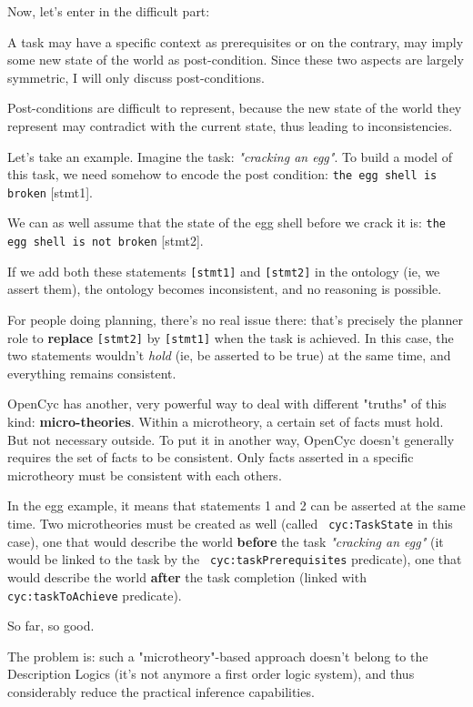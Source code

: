 Now, let's enter in the difficult part:

A task may have a specific context as prerequisites or on the contrary, may
imply some new state of the world as post-condition.  Since these two aspects
are largely symmetric, I will only discuss post-conditions.

Post-conditions are difficult to represent, because the new state of the world
they represent may contradict with the current state, thus leading to
inconsistencies.

Let's take an example. Imagine the task: \emph{"cracking an egg"}. To build a
model of this task, we need somehow to encode the post condition: {\tt the egg
shell is broken} [stmt1].

We can as well assume that the state of the egg shell before we crack it is:
{\tt the egg shell is not broken} [stmt2].

If we add both these statements {\tt [stmt1]} and {\tt [stmt2]} in the ontology
(ie, we assert them), the ontology becomes inconsistent, and no reasoning is
possible.

For people doing planning, there's no real issue there: that's precisely the
planner role to {\bf replace} {\tt [stmt2]} by {\tt [stmt1]} when the task is
achieved. In this case, the two statements wouldn't \emph{hold} (ie, be
asserted to be true) at the same time, and everything remains consistent.

OpenCyc has another, very powerful way to deal with different "truths" of this
kind: {\bf micro-theories}. Within a microtheory, a certain set of facts must
hold. But not necessary outside. To put it in another way, OpenCyc doesn't
generally requires the set of facts to be consistent. Only facts asserted in a
specific microtheory must be consistent with each others.

In the egg example, it means that statements 1 and 2 can be asserted at the
same time. Two microtheories must be created as well (called {\tt
cyc:TaskState} in this case), one that would describe the world {\bf before}
the task \emph{"cracking an egg"} (it would be linked to the task by the {\tt
cyc:taskPrerequisites} predicate), one that would describe the world {\bf
after} the task completion (linked with {\tt cyc:taskToAchieve} predicate).

So far, so good.

The problem is: such a "microtheory"-based approach doesn't belong to the
Description Logics (it's not anymore a first order logic system), and thus
considerably reduce the practical inference capabilities.

